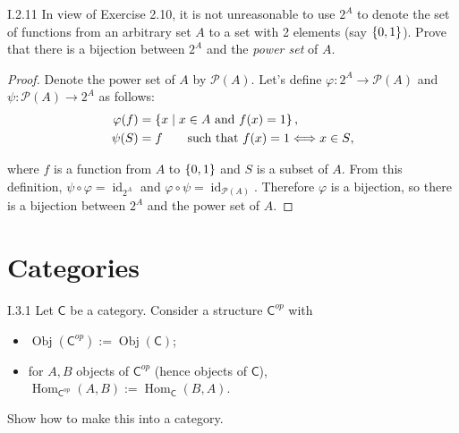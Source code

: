 \begin{exercise}{I.2.11}
	In view of Exercise 2.10, it is not unreasonable to use $2^{A}$ to denote the set of functions from an arbitrary set $A$ to a set with 2 elements (say $\left\{{0, 1}\right\}$). Prove that there is a bijection between $2^{A}$ and the \textit{power set} of $A$.
\end{exercise}

\begin{proof}
	Denote the power set of $A$ by $\mathscr{P}(A)$. Let's define $\varphi: 2^{A}\to \mathscr{P}(A)$ and $\psi: \mathscr{P}(A)\to 2^{A}$ as follows:
	\begin{align*}
		\varphi(f) & = \left\{{x \mid x\in A \text{ and } f(x) = 1}\right\},                      \\
		\psi(S)    & = f \qquad\text{such that $f(x) = 1 \Longleftrightarrow x\in S$},
	\end{align*}

	where $f$ is a function from $A$ to $\left\{{0, 1}\right\}$ and $S$ is a subset of $A$. From this definition, $\psi\circ\varphi = \operatorname{id}_{2^{A}}$ and $\varphi\circ\psi = \operatorname{id}_{\mathscr{P}(A)}$. Therefore $\varphi$ is a bijection, so there is a bijection between $2^{A}$ and the power set of $A$.
\end{proof}

\section{Categories}

\begin{exercise}{I.3.1}
	Let $\mathsf{C}$ be a category. Consider a structure ${\mathsf{C}}^{op}$ with
	\begin{itemize}
		\item $\operatorname{Obj}({\mathsf{C}}^{op}) := \operatorname{Obj}(\mathsf{C})$;
		\item for $A, B$ objects of ${\mathsf{C}}^{op}$ (hence objects of $\mathsf{C}$), $\operatorname{Hom}_{{\mathsf{C}}^{op}}(A, B) := \operatorname{Hom}_{\mathsf{C}}(B, A)$.
	\end{itemize}

	Show how to make this into a category.
\end{exercise}

